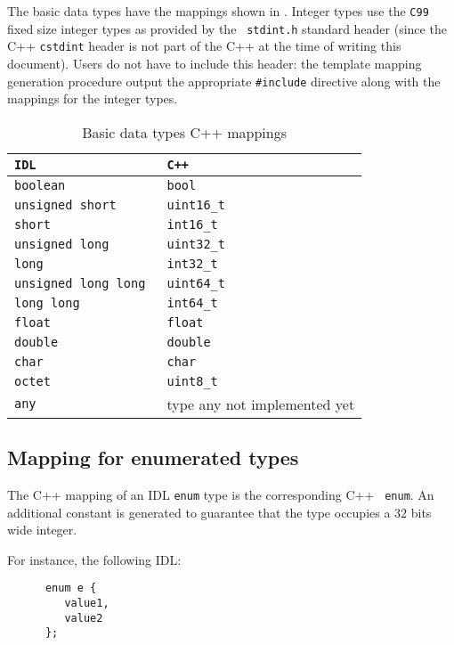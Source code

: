 The     basic     data     types     have     the     mappings     shown     in
.       Integer
types  use the  {\tt C99}  fixed size  integer types  as provided  by  the {\tt
stdint.h} standard  header (since the C++  {\tt cstdint} header is  not part of
the C++ at  the time of writing  this document).  Users do not  have to include
this header:  the template mapping generation procedure  output the appropriate
{\tt \#include} directive along with the mappings for the integer types.

\begin{table}
\centering
\begin{tabular}{|ll|}
\doublehline
{\tt\bfseries IDL} & {\tt\bfseries C++}\\
\hline
\tt boolean              & \tt bool\\
\tt unsigned short       & \tt uint16\_t\\
\tt short                & \tt int16\_t\\
\tt unsigned long        & \tt uint32\_t\\
\tt long                 & \tt int32\_t\\
\tt unsigned long long   & \tt uint64\_t\\
\tt long long            & \tt int64\_t\\
\tt float                & \tt float\\
\tt double               & \tt double\\
\tt char                 & \tt char\\
\tt octet                & \tt uint8\_t\\
\tt any                  & type any not implemented yet\\
\hline
\end{tabular}
\caption{Basic data types C++ mappings}
\label{table:mapping:cxxbasic}
\end{table}


\subsection{Mapping for enumerated types}

The  C++ mapping  of  an IDL  {\tt enum}  type  is the  corresponding C++  {\tt
enum}. An additional constant is  generated to guarantee that the type occupies
a $32$ bits wide integer.

For instance, the following IDL:
\begin{verbatim}
      enum e {
         value1,
         value2
      };
\end{verbatim}

